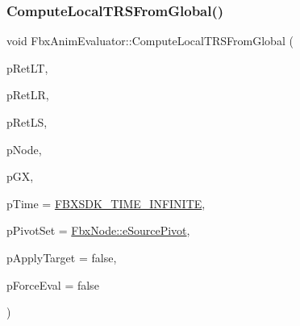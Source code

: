 \subsubsection{\texorpdfstring{Compute\+Local\+T\+R\+S\+From\+Global()}{ComputeLocalTRSFromGlobal()}}
{\footnotesize\ttfamily void Fbx\+Anim\+Evaluator\+::\+Compute\+Local\+T\+R\+S\+From\+Global (\begin{DoxyParamCaption}\item[{\hyperlink{class_fbx_vector4}{Fbx\+Vector4} \&}]{p\+Ret\+LT,  }\item[{\hyperlink{class_fbx_vector4}{Fbx\+Vector4} \&}]{p\+Ret\+LR,  }\item[{\hyperlink{class_fbx_vector4}{Fbx\+Vector4} \&}]{p\+Ret\+LS,  }\item[{\hyperlink{class_fbx_node}{Fbx\+Node} $\ast$}]{p\+Node,  }\item[{\hyperlink{class_fbx_a_matrix}{Fbx\+A\+Matrix} \&}]{p\+GX,  }\item[{const \hyperlink{class_fbx_time}{Fbx\+Time} \&}]{p\+Time = {\ttfamily \hyperlink{fbxtime_8h_a1e6db3fe0f84f0b7daa775739f93526f}{F\+B\+X\+S\+D\+K\+\_\+\+T\+I\+M\+E\+\_\+\+I\+N\+F\+I\+N\+I\+TE}},  }\item[{\hyperlink{class_fbx_node_ae62b7311ac4727654cdf1ebd5cbf7343}{Fbx\+Node\+::\+E\+Pivot\+Set}}]{p\+Pivot\+Set = {\ttfamily \hyperlink{class_fbx_node_ae62b7311ac4727654cdf1ebd5cbf7343ae8ed37a5c7e41f8d1cec9d3fa8424b69}{Fbx\+Node\+::e\+Source\+Pivot}},  }\item[{bool}]{p\+Apply\+Target = {\ttfamily false},  }\item[{bool}]{p\+Force\+Eval = {\ttfamily false} }\end{DoxyParamCaption})}


